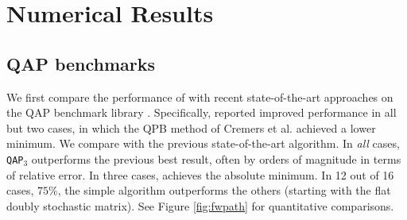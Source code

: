 \documentclass[10pt,journal,cspaper,compsoc]{IEEEtran}
\begin{document}
% 




\section{Numerical Results} %
\label{sub:numerical_results}



\subsection{QAP benchmarks}

We first compare the performance of \qapm with recent state-of-the-art approaches on the QAP benchmark library \cite{Burkard1997}.  Specifically, \cite{Zaslavskiy2009} reported improved performance in all but two cases, in which the QPB method of Cremers et al. \cite{Schellewald2001} achieved a lower minimum.  We compare \qapm with the previous state-of-the-art algorithm.  In \emph{all} cases, \texttt{QAP}$_3$ outperforms the previous best result, often by orders of magnitude in terms of relative error. In three cases, \qapb achieves the absolute minimum.  In 12 out of 16 cases, $75\%$, the simple \qapa algorithm outperforms the others (starting with the flat doubly stochastic matrix).  See Figure \ref{fig:fwpath} for quantitative comparisons.
\end{document}
